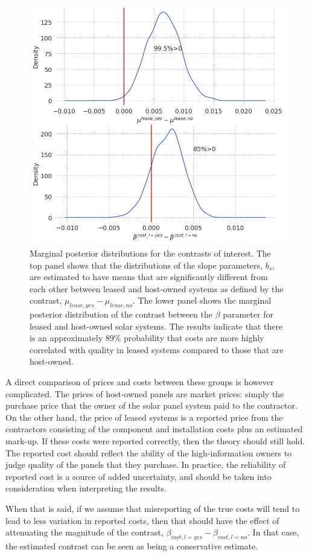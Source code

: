 \documentclass[12pt]{article}
\begin{document}
\begin{figure}
  \centering
  \includegraphics[width=.6\linewidth]{figures/bayes_hypos.png}
  \caption{Marginal posterior distributions for the contrasts of interest. The top panel shows that the distributions of the slope parameters, $b_s$, are estimated to have means that are significantly different from each other between leased and host-owned systems as defined by the contrast, $\mu_{lease, yes} - \mu_{lease, no}$. The lower panel shows the marginal posterior distribution of the contrast between the $\beta$ parameter for leased and host-owned solar systems. The results indicate that there is an approximately 89\% probability that costs are more highly correlated with quality in leased systems compared to those that are host-owned.}
  \label{fig:contrasts}
\end{figure}

A direct comparison of prices and costs between these groups is however complicated. The prices of host-owned panels are market prices: simply the purchase price that the owner of the solar panel system paid to the contractor. On the other hand, the price of leased systems is a reported price from the contractors consisting of the component and installation costs plus an estimated mark-up. If these costs were reported correctly, then the theory should still hold. The reported cost should reflect the ability of the high-information owners to judge quality of the panels that they purchase. In practice, the reliability of reported cost is a source of added uncertainty, and should be taken into consideration when interpreting the results.

When that is said, if we assume that misreporting of the true costs will tend to lead to less variation in reported costs, then that should have the effect of attenuating the magnitude of the contrast, $\beta_{cost, l=yes} - \beta_{cost, l=no}$. In that case, the estimated contrast can be seen as being a conservative estimate.
\end{document}
